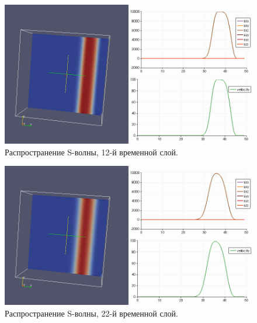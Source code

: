 \begin{figure}[htp]
\centering
\includegraphics[width=\textwidth]{png/s-wave-propogation-3d-012.png}
\caption{Распространение S-волны, 12-й временной слой.}
\label{pic:s_wave_12}
\end{figure}
\begin{figure}[htp]
\centering
\includegraphics[width=\textwidth]{png/s-wave-propogation-3d-022.png}
\caption{Распространение S-волны, 22-й временной слой.}
\label{pic:s_wave_22}
\end{figure}
